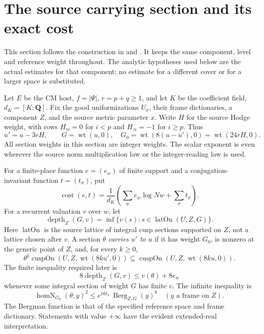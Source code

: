 \section{The source carrying section and its exact cost}
\label{sec:ftb-carrying-section}
This section follows the construction in
 and
.  It keeps the same component,
level and reference weight throughout.  The analytic hypotheses used below
are the actual estimates for that component; no estimate for a different
cover or for a larger space is substituted.

Let \(E\) be the CM host, \(f=|\Psi|\), \(r=p+q\geq1\), and let \(K\)
be the coefficient field, \(d_K=[K:\mathbf Q]\).
Fix the good uniformizations \(U_\sigma\), their frame dictionaries, a
component \(Z\), and the source metric parameter \(x\).
Write \(H\) for the source Hodge weight, with rows
\(H_{\tau i}=0\) for \(i<p\) and \(H_{\tau i}=-1\) for \(i\geq p\).
Thus
\[
 u'=u-3rH,\qquad
 G=\operatorname{wt}(u,0),\quad
 G_0=\operatorname{wt}(8(u-u'),0)=\operatorname{wt}(24rH,0).
\]
All section weights in this section are integer weights.
The scalar exponent is even wherever the source norm multiplication
law or the integer-reading law is used.

For a finite-place function \(e=(e_w)\) of finite support and a
conjugation-invariant function \(t=(t_\sigma)\), put
\[
 \operatorname{cost}(e,t)=\frac1{d_K}
  \left(\sum_w e_w\log Nw+\sum_\sigma t_\sigma\right).
\]
For a recurrent valuation \(v\) over \(w\), let
\[
 \operatorname{depth}_Z(G,v)
   =\inf\{v(s):s\in\operatorname{latOn}(U,Z,G)\}.
\]
Here \(\operatorname{latOn}\) is the source lattice of integral cusp
sections supported on \(Z\), not a lattice chosen after \(v\).
A section \(\theta\) \emph{carries \(u'\) to \(u\)} if it has weight
\(G_0\), is nonzero at the generic point of \(Z\), and, for every
\(k\geq0\),
\[
 \theta^k\operatorname{cuspOn}(U,Z,\operatorname{wt}(8ku',0))
 \subseteq
 \operatorname{cuspOn}(U,Z,\operatorname{wt}(8ku,0)).
 \tag{C1}\label{eq:ftb-carries}
\]
The finite inequality required later is
\[
 8\operatorname{depth}_Z(G,v)
       \leq v(\theta)+8e_w                         \tag{C2}\label{eq:ftb-finbd}
\]
whenever some integral section of weight \(G\) has finite \(v\).
The infinite inequality is
\[
 \operatorname{homN}_{G_0}(\theta;y)^2
   \leq e^{16t_\sigma}\,
           \operatorname{Berg}_{Z,G}(y)^8
 \quad (y\text{ a frame on }Z).                    \tag{C3}\label{eq:ftb-infbd}
\]
The Bergman function is that of the specified reference space and frame
dictionary.  Statements with value \(+\infty\) have the evident
extended-real interpretation.

